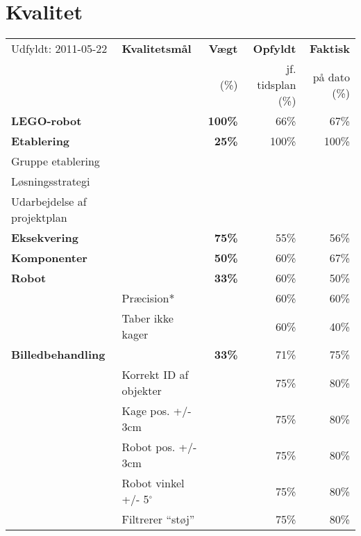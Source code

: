 \section{Kvalitet}
\begin{footnotesize}
\begin{center}
\begin{tabular}{l | l | r r r}
	\footnotesize{Udfyldt: 2011-05-22}	& \textbf{Kvalitetsmål} & \textbf{Vægt} & \textbf{Opfyldt} & \textbf{Faktisk}\\
	& & \footnotesize{(\%)}	& \footnotesize{jf. tidsplan (\%)}	& \footnotesize{på dato (\%)} \\
	\hline
	\textbf{LEGO-robot}
																&		& \textbf{100\%} & 66\% & 67\% \\
	\hline
	\hline
	\textbf{Etablering}
																&		& \textbf{25\%} 	& 	100\%	& 100\% \\
	\hspace*{0.3cm} Gruppe etablering
					 											&		&		&		& \\
	\hspace*{0.3cm} Løsningsstrategi
					 											&		&		&		& \\
	\hspace*{0.3cm} Udarbejdelse af projektplan 
																&		&		&		& \\
	\hline
	\textbf{Eksekvering}
																&		& \textbf{75\%}	& 55\% & 56\% \\		
	\hspace*{0.3cm}\textbf{Komponenter}
																&		& \textbf{50\%}		& 	60\% & 67\%\\
	\hspace*{0.3cm}\hspace*{0.3cm} \textbf{Robot}
																& 		& \textbf{33\%} 	& 	60\% & 50\% \\
	& Præcision* & & 60\% & 60\% \\
	& Taber ikke kager & & 60\% & 40\% \\
	\hspace*{0.3cm}\hspace*{0.3cm} \textbf{Billedbehandling}
																& & \textbf{33\%}		&	71\% & 	75\% \\
	& Korrekt ID af objekter & & 75\% & 80\% \\
	& Kage pos. +/- 3cm & & 75\% & 80\% \\
	& Robot pos. +/- 3cm & & 75\% & 80\% \\
	& Robot vinkel +/- 5$^\circ$ & & 75\% & 80\% \\
	& Filtrerer "`støj"' & & 75\% & 80\% \\

\end{tabular}
\end{center}
\end{footnotesize}
